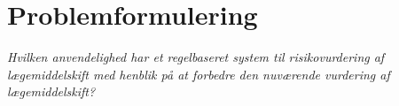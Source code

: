 
\section{Problemformulering}
\textit{Hvilken anvendelighed har et regelbaseret system til risikovurdering af lægemiddelskift med henblik på at forbedre den nuværende vurdering af lægemiddelskift?}




